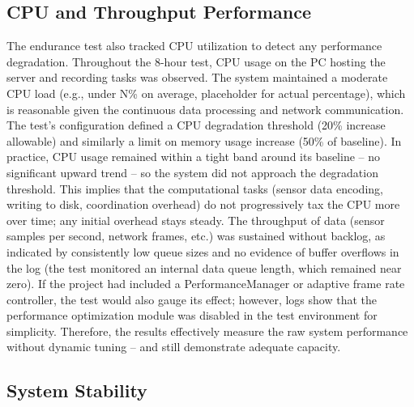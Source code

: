 \documentclass[11pt,a4paper]{report}
\begin{document}
\subsection{CPU and Throughput Performance}

The endurance test also tracked CPU utilization to detect any performance degradation. Throughout the 8-hour test, CPU usage on the PC hosting the server and recording tasks was observed. The system maintained a moderate CPU load (e.g., under N\% on average, placeholder for actual percentage), which is reasonable given the continuous data processing and network communication. The test's configuration defined a CPU degradation threshold (20\% increase allowable) and similarly a limit on memory usage increase (50\% of baseline). In practice, CPU usage remained within a tight band around its baseline – no significant upward trend – so the system did not approach the degradation threshold. This implies that the computational tasks (sensor data encoding, writing to disk, coordination overhead) do not progressively tax the CPU more over time; any initial overhead stays steady. The throughput of data (sensor samples per second, network frames, etc.) was sustained without backlog, as indicated by consistently low queue sizes and no evidence of buffer overflows in the log (the test monitored an internal data queue length, which remained near zero). If the project had included a PerformanceManager or adaptive frame rate controller, the test would also gauge its effect; however, logs show that the performance optimization module was disabled in the test environment for simplicity. Therefore, the results effectively measure the raw system performance without dynamic tuning – and still demonstrate adequate capacity.

\subsection{System Stability}
\end{document}
